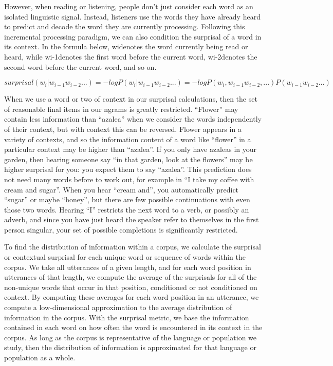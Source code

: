 \documentclass[11pt,]{article}
\begin{document}
However, when reading or listening, people don't just consider each word as an isolated linguistic signal. Instead, listeners use the words they have already heard to predict and decode the word they are currently processing. Following this incremental processing paradigm, we can also condition the surprisal of a word in its context. In the formula below, widenotes the word currently being read or heard, while wi-1denotes the first word before the current word, wi-2denotes the second word before the current word, and so on.

\[surprisal(w_i|w_{i-1}w_{i-2}...) = -log P(w_i|w_{i-1}w_{i-2}...) = -log P(w_i,w_{i-1}w_{i-2},...)P(w_{i-1}w_{i-2}...)\]

When we use a word or two of context in our surprisal calculations, then the set of reasonable final items in our ngrams is greatly restricted. ``Flower'' may contain less information than ``azalea'' when we consider the words independently of their context, but with context this can be reversed. Flower appears in a variety of contexts, and so the information content of a word like ``flower'' in a particular context may be higher than ``azalea''. If you only have azaleas in your garden, then hearing someone say ``in that garden, look at the flowers'' may be higher surprisal for you: you expect them to say ``azalea''. This prediction does not need many words before to work out, for example in ``I take my coffee with cream and sugar''. When you hear ``cream and'', you automatically predict ``sugar'' or maybe ``honey'', but there are few possible continuations with even those two words. Hearing ``I'' restricts the next word to a verb, or possibly an adverb, and since you have just heard the speaker refer to themselves in the first person singular, your set of possible completions is significantly restricted.

To find the distribution of information within a corpus, we calculate the surprisal or contextual surprisal for each unique word or sequence of words within the corpus. We take all utterances of a given length, and for each word position in utterances of that length, we compute the average of the surprisals for all of the non-unique words that occur in that position, conditioned or not conditioned on context. By computing these averages for each word position in an utterance, we compute a low-dimensional approximation to the average distribution of information in the corpus. With the surprisal metric, we base the information contained in each word on how often the word is encountered in its context in the corpus. As long as the corpus is representative of the language or population we study, then the distribution of information is approximated for that language or population as a whole.
\end{document}
